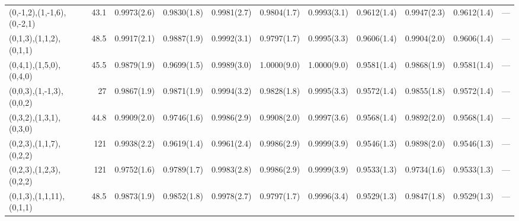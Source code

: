 \begin{tabular}{lrlllllllll}
 (0,-1,2),(1,-1,6),(0,-2,1) &   43.1 & 0.9973(2.6) & 0.9830(1.8) & 0.9981(2.7) & 0.9804(1.7)    & 0.9993(3.1)  & 0.9612(1.4)    & 0.9947(2.3)  & 0.9612(1.4) & ---    \\
 (0,1,3),(1,1,2),(0,1,1)    &   48.5 & 0.9917(2.1) & 0.9887(1.9) & 0.9992(3.1) & 0.9797(1.7)    & 0.9995(3.3)  & 0.9606(1.4)    & 0.9904(2.0)  & 0.9606(1.4) & ---    \\
 (0,4,1),(1,5,0),(0,4,0)    &   45.5 & 0.9879(1.9) & 0.9699(1.5) & 0.9989(3.0) & 1.0000(9.0)    & 1.0000(9.0)  & 0.9581(1.4)    & 0.9868(1.9)  & 0.9581(1.4) & ---    \\
 (0,0,3),(1,-1,3),(0,0,2)   &   27   & 0.9867(1.9) & 0.9871(1.9) & 0.9994(3.2) & 0.9828(1.8)    & 0.9995(3.3)  & 0.9572(1.4)    & 0.9855(1.8)  & 0.9572(1.4) & ---    \\
 (0,3,2),(1,3,1),(0,3,0)    &   44.8 & 0.9909(2.0) & 0.9746(1.6) & 0.9986(2.9) & 0.9908(2.0)    & 0.9997(3.6)  & 0.9568(1.4)    & 0.9892(2.0)  & 0.9568(1.4) & ---    \\
 (0,2,3),(1,1,7),(0,2,2)    &  121   & 0.9938(2.2) & 0.9619(1.4) & 0.9961(2.4) & 0.9986(2.9)    & 0.9999(3.9)  & 0.9546(1.3)    & 0.9898(2.0)  & 0.9546(1.3) & ---    \\
 (0,2,3),(1,2,3),(0,2,2)    &  121   & 0.9752(1.6) & 0.9789(1.7) & 0.9983(2.8) & 0.9986(2.9)    & 0.9999(3.9)  & 0.9533(1.3)    & 0.9734(1.6)  & 0.9533(1.3) & ---    \\
 (0,1,3),(1,1,11),(0,1,1)   &   48.5 & 0.9873(1.9) & 0.9852(1.8) & 0.9978(2.7) & 0.9797(1.7)    & 0.9996(3.4)  & 0.9529(1.3)    & 0.9847(1.8)  & 0.9529(1.3) & ---    \\
\hline
\end{tabular}